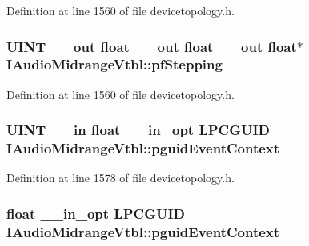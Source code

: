 Definition at line 1560 of file devicetopology.\+h.

\subsubsection[{\texorpdfstring{pf\+Stepping}{pfStepping}}]{ {\bf U\+I\+NT} {\bf \+\_\+\+\_\+out} float {\bf \+\_\+\+\_\+out} float {\bf \+\_\+\+\_\+out} float$\ast$ I\+Audio\+Midrange\+Vtbl\+::pf\+Stepping}\hypertarget{struct_i_audio_midrange_vtbl_a382fb50e024b6b37d02cbefa594e9f8c}{}\label{struct_i_audio_midrange_vtbl_a382fb50e024b6b37d02cbefa594e9f8c}


Definition at line 1560 of file devicetopology.\+h.

\subsubsection[{\texorpdfstring{pguid\+Event\+Context}{pguidEventContext}}]{ {\bf U\+I\+NT} {\bf \+\_\+\+\_\+in} float {\bf \+\_\+\+\_\+in\+\_\+opt} {\bf L\+P\+C\+G\+U\+ID} I\+Audio\+Midrange\+Vtbl\+::pguid\+Event\+Context}\hypertarget{struct_i_audio_midrange_vtbl_ae4a9758067e08540743362b953da12bb}{}\label{struct_i_audio_midrange_vtbl_ae4a9758067e08540743362b953da12bb}


Definition at line 1578 of file devicetopology.\+h.

\subsubsection[{\texorpdfstring{pguid\+Event\+Context}{pguidEventContext}}]{ float {\bf \+\_\+\+\_\+in\+\_\+opt} {\bf L\+P\+C\+G\+U\+ID} I\+Audio\+Midrange\+Vtbl\+::pguid\+Event\+Context}\hypertarget{struct_i_audio_midrange_vtbl_a289baa5a5a7e94a1528939f1e838ef7c}{}\label{struct_i_audio_midrange_vtbl_a289baa5a5a7e94a1528939f1e838ef7c}


